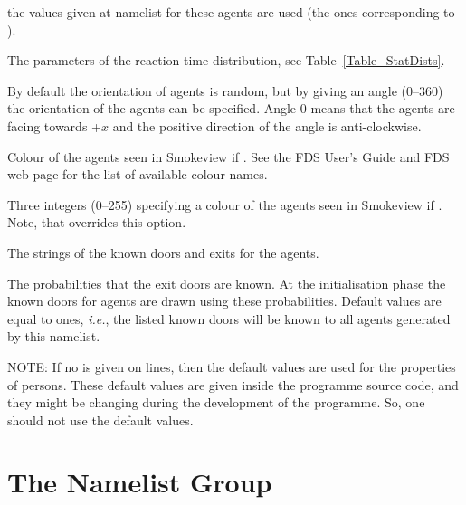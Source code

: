 \documentclass[12pt,a4paper,final,twoside]{stylevk}
\begin{document}
\begin{description}
  the values given at  namelist for these agents are used
  (the ones corresponding to ).
%
\item[\Timts{PRE\_MEAN,PRE\_PARA,PRE\_PARA2,PRE\_LOW,PRE\_HIGH}] The
  parameters of the reaction time distribution, see
  Table~\ref{Table_StatDists}.
%
\item[\Timts{ANGLE}] By default the orientation of agents is random,
  but by giving an angle (0--360) the orientation of the agents can be
  specified.  Angle 0 means that the agents are facing towards +$x$
  and the positive direction of the angle is anti-clockwise.
%
\item[\Timts{AVATAR\_COLOR}] Colour of the agents seen in Smokeview if
  .  See the FDS User's Guide and FDS web page
  for the list of available colour names.
%
\item[\Timts{AVATAR\_RGB}] Three integers (0--255) specifying a colour
  of the agents seen in Smokeview if .  Note,
  that  overrides this option.
%
\item[\Timts{KNOWN\_DOOR\_NAMES}] The  strings of the known
  doors and exits for the agents.
%
\item[\Timts{KNOWN\_DOOR\_PROBS}] The probabilities that the exit
  doors are known.  At the initialisation phase the known doors for
  agents are drawn using these probabilities.  Default values are
  equal to ones, \emph{i.e.}, the listed known doors will be known to
  all agents generated by this  namelist.
%
\end{description}

\noindent NOTE: If no  is given on  lines,
then the default values are used for the properties of persons.  These
default values are given inside the programme source code, and they
might be changing during the development of the programme.  So, one
should not use the default values.


\section{The  Namelist Group}\label{Sec_EvhoNML}
\end{document}
